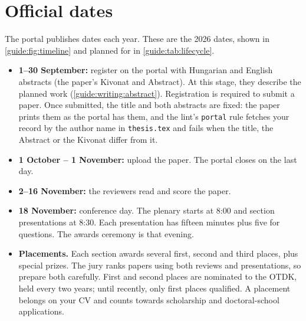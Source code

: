 \section{Official dates}\label{guide:tdk:dates}
The portal publishes dates each year. These are the 2026 dates, shown in \cref{guide:fig:timeline} and planned for in \cref{guide:tab:lifecycle}.
\begin{itemize}
  \item \textbf{1--30 September:} register on the portal with Hungarian and English abstracts (the paper's Kivonat and Abstract). At this stage, they describe the planned work (\cref{guide:writing:abstract}). Registration is required to submit a paper. Once submitted, the title and both abstracts are fixed: the paper prints them as the portal has them, and the lint's \texttt{portal} rule fetches your record by the author name in \texttt{thesis.tex} and fails when the title, the Abstract or the Kivonat differ from it.
  \item \textbf{1 October -- 1 November:} upload the paper. The portal closes on the last day.
  \item \textbf{2--16 November:} the reviewers read and score the paper.
  \item \textbf{18 November:} conference day. The plenary starts at 8:00 and section presentations at 8:30. Each presentation has fifteen minutes plus five for questions. The awards ceremony is that evening.
  \item \textbf{Placements.} Each section awards several first, second and third places, plus special prizes. The jury ranks papers using both reviews and presentations, so prepare both carefully. First and second places are nominated to the OTDK, held every two years; until recently, only first places qualified. A placement belongs on your CV and counts towards scholarship and doctoral-school applications.
\end{itemize}


